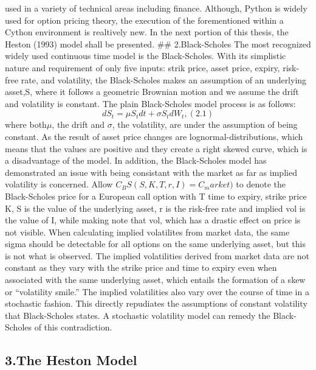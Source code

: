 \documentclass[11pt,]{article}
\begin{document}
used in a variety of technical areas including finance. Although, Python
is widely used for option pricing theory, the execution of the
forementioned within a Cython environment is realtively new. In the next
portion of this thesis, the Heston (1993) model shall be presented. \#\#
2.Black-Scholes The most recognized widely used continuous time model is
the Black-Scholes. With its simplistic nature and requirement of only
five inputs: strik price, asset price, expiry, risk-free rate, and
volatility, the Black-Scholes makes an assumption of an underlying
asset,S, where it follows a geometric Brownian motion and we assume the
drift and volatility is constant. The plain Black-Scholes model process
is as follows: \[
dS_{t} = \mu S_{t} dt + \sigma S_{t} dW_t,                          (2.1)
\] where both\(\mu\), the drift and \(\sigma\), the volatility, are
under the assumption of being constant. As the result of asset price
changes are lognormal-distributions, which means that the values are
positive and they create a right skewed curve, which is a disadvantage
of the model. In addition, the Black-Scholes model has demonstrated an
issue with being consistant with the market as far as implied volatility
is concerned. Allow \(C_BS(S,K,T,r,I) = C_market)\) to denote the
Black-Scholes price for a European call option with T time to expiry,
strike price K, S is the value of the underlying asset, r is the
risk-free rate and implied vol is the value of I, while making note that
vol, which has a drastic effect on price is not visible. When
calculating implied volatilites from market data, the same sigma should
be detectable for all options on the same underlying asset, but this is
not what is observed. The implied volatilities derived from market data
are not constant as they vary with the strike price and time to expiry
even when associated with the same underlying asset, which entails the
formation of a skew or ``volatility smile.'' The implied volatilities
also vary over the course of time in a stochastic fashion. This directly
repudiates the assumptions of constant volatility that Black-Scholes
states. A stochastic volatility model can remedy the Black-Scholes of
this contradiction.

\subsection{3.The Heston Model}\label{the-heston-model}
\end{document}
